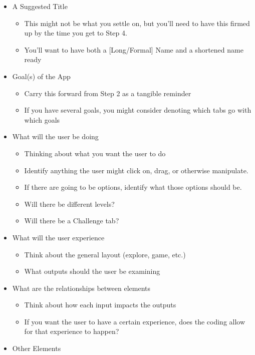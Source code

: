 \documentclass[
]{book}
\providecommand{\tightlist}{%
  \setlength{\itemsep}{0pt}\setlength{\parskip}{0pt}}
\begin{document}
\begin{itemize}
\tightlist
\item
  A Suggested Title

  \begin{itemize}
  \tightlist
  \item
    This might not be what you settle on, but you'll need to have this firmed up by the time you get to Step 4.
  \item
    You'll want to have both a {[}Long/Formal{]} Name and a shortened name ready
  \end{itemize}
\item
  Goal(s) of the App

  \begin{itemize}
  \tightlist
  \item
    Carry this forward from Step 2 as a tangible reminder
  \item
    If you have several goals, you might consider denoting which tabs go with which goals
  \end{itemize}
\item
  What will the user be doing

  \begin{itemize}
  \tightlist
  \item
    Thinking about what you want the user to do
  \item
    Identify anything the user might click on, drag, or otherwise manipulate.
  \item
    If there are going to be options, identify what those options should be.
  \item
    Will there be different levels?
  \item
    Will there be a Challenge tab?
  \end{itemize}
\item
  What will the user experience

  \begin{itemize}
  \tightlist
  \item
    Think about the general layout (explore, game, etc.)
  \item
    What outputs should the user be examining
  \end{itemize}
\item
  What are the relationships between elements

  \begin{itemize}
  \tightlist
  \item
    Think about how each input impacts the outputs
  \item
    If you want the user to have a certain experience, does the coding allow for that experience to happen?
  \end{itemize}
\item
  Other Elements


\end{itemize}
\end{document}
